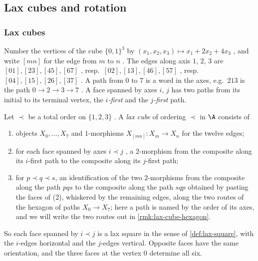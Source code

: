\subsection{Lax cubes and rotation}
\label{subsec:mates-cubes}

\subsubsection*{Lax cubes}
%
Number the vertices of the cube $\{0,1\}^{3}$ by
$(x_{1},x_{2},x_{3}) \mapsto x_{1} + 2x_{2} + 4x_{3}$ ,
and write $[mn]$ for the edge from $m$ to $n$ . The edges along axis $1$, $2$,
$3$ are $[01],[23],[45],[67]$ , resp.\ $[02],[13],[46],[57]$ ,
resp.\ $[04],[15],[26],[37]$ . A path from $0$ to $7$ is a word in the axes,
e.g.\ $213$ is the path $0 \to 2 \to 3 \to 7$ . A face spanned by axes $i$,
$j$ has two paths from its initial to its terminal vertex,
the \emph{$i$-first} and the \emph{$j$-first} path.

\begin{defi}
\label{def:lax-cube}
%
Let $\prec$ be a total order on $\{1,2,3\}$ .
A \emph{lax cube} of ordering $\prec$ in $\A$ consists of
\begin{enumerate}
\item objects $X_{0},\dots,X_{7}$ and $1$-morphisms
$X_{[mn]}\colon X_{m} \to X_{n}$
for the twelve edges;
\item for each face spanned by axes $i \prec j$ ,
a $2$-morphism from the composite along its $i$-first path to the composite
along its $j$-first path;
\item for $p \prec q \prec s$, an identification of the two $2$-morphisms from
the composite along the path $pqs$ to the composite along the path $sqp$
obtained by pasting the faces of (2), whiskered by the remaining edges,
along the two routes of the hexagon of paths $X_{0} \to X_{7}$;
here a path is named by the order of its axes,
and we will write the two routes out in \cref{rmk:lax-cube-hexagon}.
\end{enumerate}
\end{defi}

%
So each face spanned by $i \prec j$ is a lax square in the sense of
\cref{def:lax-square}, with the $i$-edges horizontal and the $j$-edges vertical.
Opposite faces have the same orientation,
and the three faces at the vertex $0$ determine all six.

